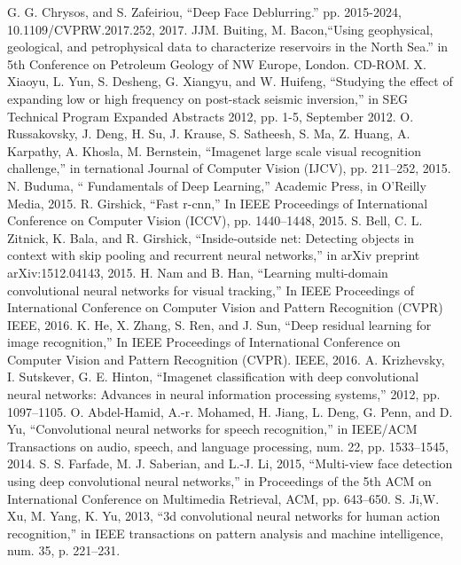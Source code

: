\documentclass[conference]{IEEEtran}
\begin{document}
\begin{thebibliography}{00}
		G. G. Chrysos, and S. Zafeiriou, ``Deep Face Deblurring.'' pp. 2015-2024, 10.1109/CVPRW.2017.252, 2017. 
 		JJM. Buiting, M. Bacon,``Using geophysical, geological, and petrophysical data to characterize reservoirs in the North Sea.'' in 5th Conference on Petroleum Geology of NW Europe, London. CD-ROM.
  		X. Xiaoyu, L. Yun, S. Desheng, G. Xiangyu, and W. Huifeng, ``Studying the effect of expanding low or high frequency on post-stack seismic inversion,'' in SEG Technical Program Expanded Abstracts 2012, pp. 1-5, September 2012.
		O. Russakovsky, J. Deng, H. Su, J. Krause, S. Satheesh, S. Ma, Z. Huang, A. Karpathy, A. Khosla, M. Bernstein, ``Imagenet large scale visual recognition challenge,'' in ternational Journal of Computer Vision (IJCV), pp. 211–252, 2015.
  		N. Buduma, `` Fundamentals of Deep Learning,'' Academic Press, in O'Reilly Media, 2015.
		R. Girshick, ``Fast r-cnn,'' In IEEE Proceedings of International Conference on Computer Vision (ICCV), pp. 1440–1448, 2015.
		S. Bell, C. L. Zitnick, K. Bala, and R. Girshick, ``Inside-outside net: Detecting objects in context with skip pooling and recurrent neural networks,'' in arXiv preprint arXiv:1512.04143, 2015.
			H. Nam and B. Han, ``Learning multi-domain convolutional neural networks for visual tracking,'' In IEEE Proceedings of International Conference on Computer Vision and Pattern Recognition (CVPR) IEEE, 2016.
		K. He, X. Zhang, S. Ren, and J. Sun, ``Deep residual learning for image recognition,'' In IEEE Proceedings of International Conference on Computer Vision and Pattern Recognition (CVPR). IEEE, 2016.
	A. Krizhevsky, I. Sutskever, G. E. Hinton, ``Imagenet classification with deep convolutional neural networks: Advances in neural information processing systems,'' 2012, pp. 1097–1105.
	O. Abdel-Hamid, A.-r. Mohamed, H. Jiang, L. Deng, G. Penn, and D. Yu, ``Convolutional neural networks for speech recognition,'' in IEEE/ACM Transactions on audio, speech, and language processing, num. 22, pp. 1533–1545, 2014.
		S. S. Farfade, M. J. Saberian, and L.-J. Li, 2015, ``Multi-view face detection using deep convolutional neural networks,'' in Proceedings of the 5th ACM on International Conference on Multimedia Retrieval, ACM, pp. 643–650.
		S. Ji,W. Xu, M. Yang, K. Yu, 2013, ``3d convolutional neural networks for human action recognition,'' in IEEE transactions on pattern analysis and machine intelligence, num. 35, p. 221–231.

\end{thebibliography}
\end{document}
